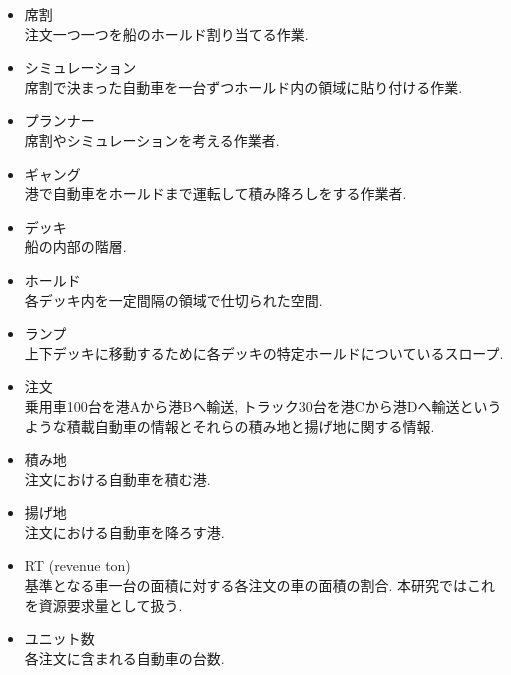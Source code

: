 \begin{itemize}

\item 席割 \\
注文一つ一つを船のホールド割り当てる作業.

\item シミュレーション \\
席割で決まった自動車を一台ずつホールド内の領域に貼り付ける作業.

\item  プランナー \\
席割やシミュレーションを考える作業者.

\item  ギャング\\
港で自動車をホールドまで運転して積み降ろしをする作業者.

\item デッキ \\
船の内部の階層.

\item ホールド \\
各デッキ内を一定間隔の領域で仕切られた空間.

\item ランプ \\
上下デッキに移動するために各デッキの特定ホールドについているスロープ.

\item 注文 \\
乗用車100台を港Aから港Bへ輸送, トラック30台を港Cから港Dへ輸送というような積載自動車の情報とそれらの積み地と揚げ地に関する情報.

\item 積み地 \\
注文における自動車を積む港.

\item 揚げ地 \\
注文における自動車を降ろす港.

\item  RT (revenue ton) \\
基準となる車一台の面積に対する各注文の車の面積の割合. 本研究ではこれを資源要求量として扱う\cite{rt}.

\item ユニット数 \\
各注文に含まれる自動車の台数.

\end{itemize}


